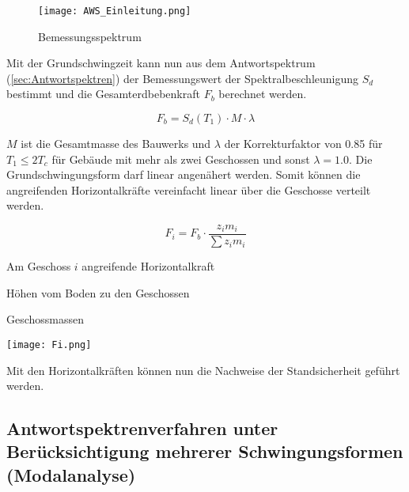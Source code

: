 \begin{figure}[H]
    \centering
    \texttt{[image: AWS\_Einleitung.png]}
    \caption{Bemessungsspektrum}
\end{figure}

\pagebreak

Mit der Grundschwingzeit kann nun aus dem Antwortspektrum (\cref{sec:Antwortspektren}) der Bemessungswert der Spektralbeschleunigung $S_d$ bestimmt und die Gesamterdbebenkraft $F_b$ berechnet werden.

\begin{equation*}
F_b = S_d(T_1) \cdot M \cdot \lambda
\end{equation*}

$M$ ist die Gesamtmasse des Bauwerks und $\lambda$ der Korrekturfaktor von 0.85 für $T_1 \leq 2T_c$ für Gebäude mit mehr als zwei Geschossen und sonst $\lambda=1.0$.
Die Grundschwingungsform darf linear angenähert werden. Somit können die angreifenden Horizontalkräfte vereinfacht linear über die Geschosse verteilt werden.

\begin{minipage}{0.6\textwidth}

\begin{equation*}
F_i = F_b \cdot \frac{z_i m_i}{\sum z_i m_i}
\end{equation*}

\vspace{2ex}
\vspace{2ex}

  Am Geschoss $i$ angreifende Horizontalkraft\par
{}  Höhen vom Boden zu den Geschossen\par
{}  Geschossmassen\par

\end{minipage}%
\hfill
\begin{minipage}{0.4\textwidth}

\begin{flushright}
\texttt{[image: Fi.png]}
\end{flushright}

\end{minipage}%

Mit den Horizontalkräften können nun die Nachweise der Standsicherheit geführt werden.

\subsection{Antwortspektrenverfahren unter Berücksichtigung mehrerer Schwingungsformen (Modalanalyse)}
\label{sec:Modalanalyse}

